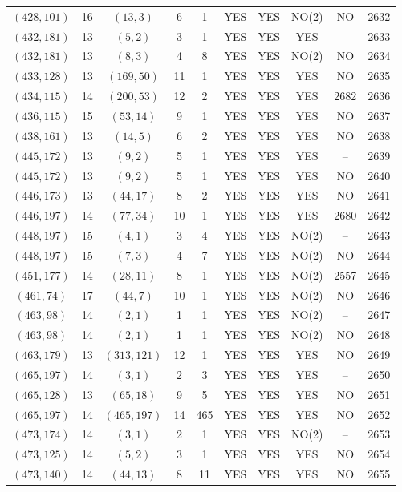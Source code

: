 \begin{longtable}{|c|c|c|c|c|c|c|c|c|c|}
$(428, 101)$ & 16 & $(13, 3)$ & 6 & 1 & YES & YES & NO(2) & NO & 2632\\
$(432, 181)$ & 13 & $(5, 2)$ & 3 & 1 & YES & YES & YES & -- & 2633\\
$(432, 181)$ & 13 & $(8, 3)$ & 4 & 8 & YES & YES & NO(2) & NO & 2634\\
$(433, 128)$ & 13 & $(169, 50)$ & 11 & 1 & YES & YES & YES & NO & 2635\\
$(434, 115)$ & 14 & $(200, 53)$ & 12 & 2 & YES & YES & YES & 2682 & 2636\\
$(436, 115)$ & 15 & $(53, 14)$ & 9 & 1 & YES & YES & YES & NO & 2637\\
$(438, 161)$ & 13 & $(14, 5)$ & 6 & 2 & YES & YES & YES & NO & 2638\\
$(445, 172)$ & 13 & $(9, 2)$ & 5 & 1 & YES & YES & YES & -- & 2639\\
$(445, 172)$ & 13 & $(9, 2)$ & 5 & 1 & YES & YES & YES & NO & 2640\\
$(446, 173)$ & 13 & $(44, 17)$ & 8 & 2 & YES & YES & YES & NO & 2641\\
$(446, 197)$ & 14 & $(77, 34)$ & 10 & 1 & YES & YES & YES & 2680 & 2642\\
$(448, 197)$ & 15 & $(4, 1)$ & 3 & 4 & YES & YES & NO(2) & -- & 2643\\
$(448, 197)$ & 15 & $(7, 3)$ & 4 & 7 & YES & YES & NO(2) & NO & 2644\\
$(451, 177)$ & 14 & $(28, 11)$ & 8 & 1 & YES & YES & NO(2) & 2557 & 2645\\
$(461, 74)$ & 17 & $(44, 7)$ & 10 & 1 & YES & YES & NO(2) & NO & 2646\\
$(463, 98)$ & 14 & $(2, 1)$ & 1 & 1 & YES & YES & NO(2) & -- & 2647\\
$(463, 98)$ & 14 & $(2, 1)$ & 1 & 1 & YES & YES & NO(2) & NO & 2648\\
$(463, 179)$ & 13 & $(313, 121)$ & 12 & 1 & YES & YES & YES & NO & 2649\\
$(465, 197)$ & 14 & $(3, 1)$ & 2 & 3 & YES & YES & YES & -- & 2650\\
$(465, 128)$ & 13 & $(65, 18)$ & 9 & 5 & YES & YES & YES & NO & 2651\\
$(465, 197)$ & 14 & $(465, 197)$ & 14 & 465 & YES & YES & YES & NO & 2652\\
$(473, 174)$ & 14 & $(3, 1)$ & 2 & 1 & YES & YES & NO(2) & -- & 2653\\
$(473, 125)$ & 14 & $(5, 2)$ & 3 & 1 & YES & YES & YES & NO & 2654\\
$(473, 140)$ & 14 & $(44, 13)$ & 8 & 11 & YES & YES & YES & NO & 2655\\

\end{longtable}
